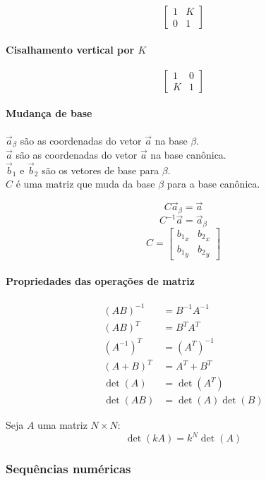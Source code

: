 \[
\begin{bmatrix}
1 & K \\
0 & 1
\end{bmatrix}
\]

\paragraph{Cisalhamento vertical por $K$}

\[
\begin{bmatrix}
1 & 0 \\
K & 1
\end{bmatrix}
\]

\paragraph{Mudança de base}

$\vec{a}_\beta$ são as coordenadas do vetor $\vec{a}$ na base $\beta$.\\
$\vec{a}$ são as coordenadas do vetor $\vec{a}$ na base canônica.\\
$\vec{b}_1$ e $\vec{b}_2$ são os vetores de base para $\beta$.\\
$C$ é uma matriz que muda da base $\beta$ para a base canônica.

\[
C\vec{a}_\beta = \vec{a}
\]
\[
C^{-1}\vec{a} = \vec{a}_\beta
\]
\[
C = \begin{bmatrix}
{b_1}_x & {b_2}_x \\
{b_1}_y & {b_2}_y
\end{bmatrix}
\]

\paragraph{Propriedades das operações de matriz}

\begin{align*}
(AB)^{-1} &= B^{-1}A^{-1} \\
(AB)^T &= B^T A^T \\
(A^{-1})^T &= (A^T)^{-1} \\
(A + B)^T &= A^T + B^T \\
\det(A) &= \det(A^T) \\
\det(AB) &= \det(A)\det(B)
\end{align*}

Seja $A$ uma matriz $N \times N$:
\[
\det(kA) = k^N \det(A)
\]

\subsubsection{Sequências numéricas}

